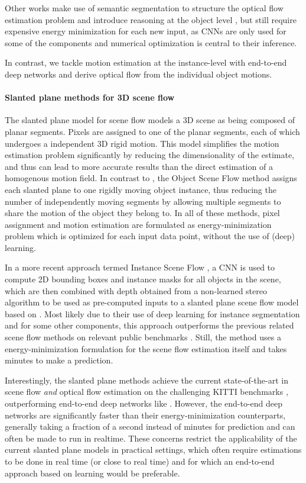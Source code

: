 Other works make use of semantic segmentation to structure
the optical flow estimation problem and introduce reasoning at the object level
\cite{ESI, JOF, FlowLayers, MRFlow},
but still require expensive energy minimization for each
new input, as CNNs are only used for some of the components and numerical
optimization is central to their inference.

In contrast, we tackle motion estimation at the instance-level with end-to-end
deep networks and derive optical flow from the individual object motions.

\paragraph{Slanted plane methods for 3D scene flow}
The slanted plane model for scene flow \cite{PRSF, PRSM} models a 3D scene as being
composed of planar segments. Pixels are assigned to one of the planar segments,
each of which undergoes a independent 3D rigid motion.
This model simplifies the motion estimation problem significantly by reducing the dimensionality
of the estimate, and thus can lead to more accurate results than the direct estimation
of a homogenous motion field.
In contrast to \cite{PRSF, PRSM}, the Object Scene Flow method \cite{KITTI2015}
assigns each slanted plane to one rigidly moving object instance, thus
reducing the number of independently moving segments by allowing multiple
segments to share the motion of the object they belong to.
In all of these methods, pixel assignment and motion estimation are formulated
as energy-minimization problem which is optimized for each input data point,
without the use of (deep) learning.

In a more recent approach termed Instance Scene Flow \cite{InstanceSceneFlow},
a CNN is used to compute 2D bounding boxes and instance masks for all objects in the scene, which are then combined
with depth obtained from a non-learned stereo algorithm to be used as pre-computed
inputs to a slanted plane scene flow model based on \cite{KITTI2015}.
Most likely due to their use of deep learning for instance segmentation and for some other components, this
approach outperforms the previous related scene flow methods on relevant public benchmarks \cite{KITTI2012, KITTI2015}.
Still, the method uses a energy-minimization formulation for the scene flow estimation itself
and takes minutes to make a prediction.

Interestingly, the slanted plane methods achieve the current state-of-the-art
in scene flow \emph{and} optical flow estimation on the challenging KITTI benchmarks \cite{KITTI2012, KITTI2015},
outperforming end-to-end deep networks like \cite{SceneFlowDataset, FlowNet, FlowNet2}.
However, the end-to-end deep networks are significantly faster than their energy-minimization counterparts,
generally taking a fraction of a second instead of minutes for prediction and can often be made to run in realtime.
These concerns restrict the applicability of the current slanted plane models in practical settings,
which often require estimations to be done in real time (or close to real time) and for which an end-to-end
approach based on learning would be preferable.

